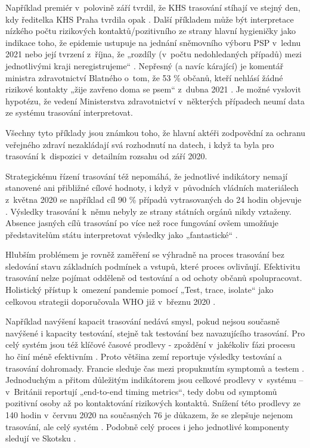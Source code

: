 Například premiér v~polovině září tvrdil, že KHS trasování stíhají ve stejný den, kdy ředitelka KHS Praha tvrdila opak \cite{tr_denik_cz}. Další příkladem může být interpretace nízkého počtu rizikových kontaktů/pozitivního ze strany hlavní hygieničky jako indikace toho, že epidemie ustupuje na jednání sněmovního výboru PSP v~lednu 2021 \cite{tr_denik_n} nebo její tvrzení z~října, že „rozdíly (v~počtu nedohledaných případů) mezi jednotlivými kraji neregistrujeme“ \cite{tr_novinky_cz}. Nepřesný (a navíc kárající) je komentář ministra zdravotnictví Blatného o~tom, že 53 \% občanů, kteří nehlásí žádné rizikové kontakty „žije zavřeno doma se psem“ z~dubna 2021 \cite{tr_tvidnes_cz}. Je možné vyslovit hypotézu, že vedení Ministerstva zdravotnictví v~některých případech neumí data ze systému trasování interpretovat. 

Všechny tyto příklady jsou známkou toho, že hlavní aktéři zodpovědní za ochranu veřejného zdraví nezakládají svá rozhodnutí na datech, i když ta byla pro trasování k~dispozici v~detailním rozsahu od září 2020.

Strategickému řízení trasování též nepomáhá, že jednotlivé indikátory nemají stanovené ani přibližné cílové hodnoty, i když v~původních vládních materiálech z~května 2020 se například cíl 90 \% případů vytrasovaných do 24 hodin objevuje \cite{tr_vlada01}. Výsledky trasování k~němu nebyly ze strany státních orgánů nikdy vztaženy. Absence jasných cílů trasování po více než roce fungování ovšem umožňuje představitelům státu interpretovat výsledky jako „fantastické“ \cite{tr_vlada02}.

Hlubším problémem je rovněž zaměření se výhradně na proces trasování bez sledování stavu základních podmínek a vstupů, které proces ovlivňují. Efektivitu trasování nelze pojímat odděleně od testování a od ochoty občanů spolupracovat. Holistický přístup k~omezení pandemie pomocí „Test, trace, isolate“ jako celkovou strategii doporučovala WHO již v~březnu 2020 \cite{tr_WHO_02}.

Například navýšení kapacit trasování nedává smysl, pokud nejsou současně na\-vý\-še\-né i kapacity testování, stejně tak testování bez navazujícího trasování. Pro celý systém jsou též klíčové časové prodlevy - zpoždění v~jakékoliv fázi procesu ho činí méně efektivním \cite{tr_systems_successful_2020}. Proto většina zemí reportuje výsledky testování a trasování dohromady. Francie sleduje čas mezi propuknutím symptomů a testem \cite{tr_france}. Jednoduchým a přitom důležitým indikátorem jsou celkové prodlevy v~systému -- v~Británii reportují „end-to-end timing metrics“, tedy dobu od symptomů pozitivní osoby až po kontaktování rizikových kontaktů. Snížení této prodlevy ze 140 hodin v~červnu 2020 na současných 76 je důkazem, že se zlepšuje nejenom trasování, ale celý systém \cite{tr_gov_uk01}. Podobně celý proces i jeho jednotlivé komponenty sledují ve Skotsku \cite{tr_scotland}.

